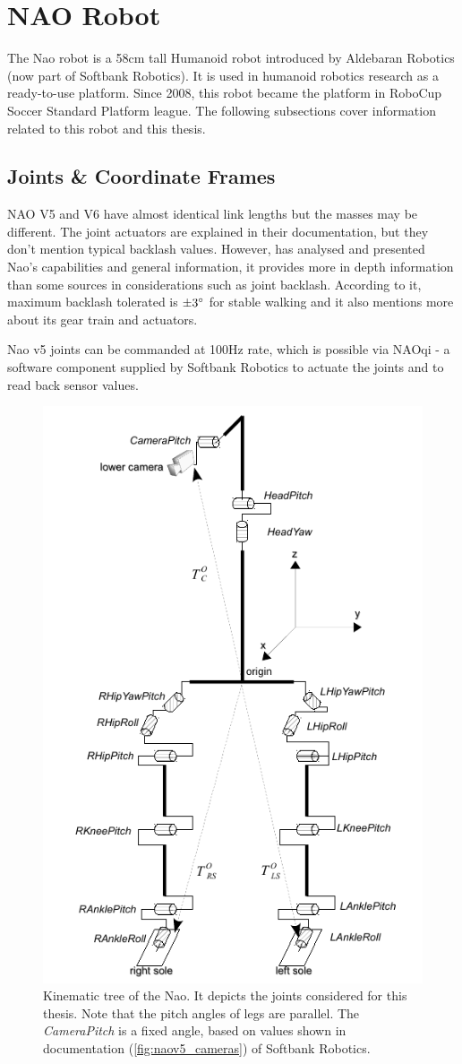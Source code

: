 \documentclass[english, printversion, nomenclature, notitle]{tuvisionthesis} %
\begin{document}
\section{NAO Robot}

The Nao robot is a 58cm tall Humanoid robot introduced by Aldebaran Robotics (now part of Softbank Robotics). It is used in humanoid robotics research as a ready-to-use platform. Since 2008, this robot became the platform in RoboCup Soccer Standard Platform league. The following subsections cover information related to this robot and this thesis.

\subsection{Joints \& Coordinate Frames}

NAO V5 and V6 have almost identical link lengths but the masses may be different. The joint actuators are explained in their documentation, but they don't mention typical backlash values. However, \cite{gouaillier_nao_2008} has analysed and presented Nao's capabilities and general information, it provides more in depth information than some sources in considerations such as joint backlash. According to it, maximum backlash tolerated is $\pm 3\degree$ for stable walking and it also mentions more about its gear train and actuators.

Nao v5 joints can be commanded at 100Hz rate, which is possible via NAOqi - a software component supplied by Softbank Robotics to actuate the joints and to read back sensor values.

\begin{figure}
	\centering
	\includegraphics[width=0.5\linewidth]{figures/joint-frame-buhuman.png}
	\caption[Kinematic tree of the Nao.]{Kinematic tree of the Nao. It depicts the joints considered for this thesis. Note that the pitch angles of legs are parallel. The \textit{CameraPitch} is a fixed angle, based on values shown in documentation (\cref{fig:naov5_cameras}) of Softbank Robotics.}
	\label{fig:joint-frame-buhuman}
\end{figure}
\end{document}
